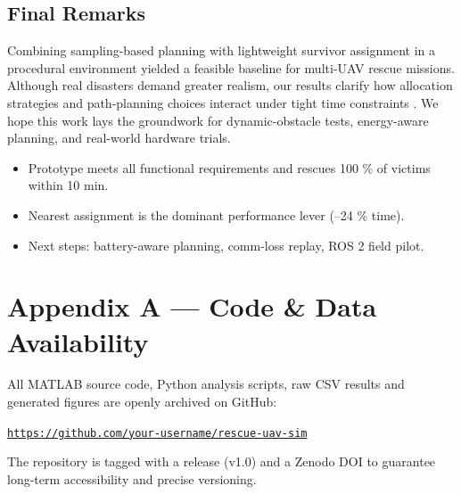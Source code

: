 \documentclass[12pt,a4paper]{report}
\begin{document}
\section{Final Remarks}
Combining sampling-based planning with lightweight survivor assignment in a
procedural environment yielded a feasible baseline for multi-UAV rescue
missions. Although real disasters demand greater realism, our results clarify
how allocation strategies and path-planning choices interact under tight time
constraints
\cite{Erdelj2017MultiUAV,Daud2022DroneDisaster,Murphy2016DisasterRoboticsNepal}.
We hope this work lays the groundwork for dynamic-obstacle tests, energy-aware
planning, and real-world hardware trials.

\begin{tcolorbox}[colback=gray!10,title=\textbf{Take-away 7.1}]
\begin{itemize}[leftmargin=1.2em]
  \item Prototype meets all functional requirements and rescues 100 \% of
        victims within 10 min.
  \item Nearest assignment is the dominant performance lever (–24 \% time).
  \item Next steps: battery-aware planning, comm-loss replay, ROS 2 field pilot.
\end{itemize}
\end{tcolorbox}

\clearpage
\appendix
{}

\chapter*{Appendix A — Code \& Data Availability}
\label{app:repo_overview}

All MATLAB source code, Python analysis scripts, raw CSV results and generated
figures are openly archived on GitHub:

\begin{center}
\smallskip
\href{https://github.com/your-username/rescue-uav-sim}{\texttt{https://github.com/your-username/rescue-uav-sim}}
\smallskip
\end{center}

The repository is tagged with a release (v1.0) and a Zenodo DOI to guarantee
long-term accessibility and precise versioning.
\end{document}
